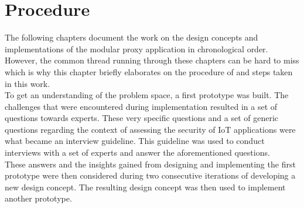 \chapter{Procedure}
The following chapters document the work on the design concepts and implementations of the modular proxy application in chronological order. However, the common thread running through these chapters can be hard to miss which is why this chapter briefly elaborates on the procedure of and steps taken in this work.\\
To get an understanding of the problem space, a first prototype was built. The challenges that were encountered during implementation resulted in a set of questions towards experts. These very specific questions and a set of generic questions regarding the context of assessing the security of \ac{IoT} applications were what became an interview guideline. This guideline was used to conduct interviews with a set of experts and answer the aforementioned questions.\\
These answers and the insights gained from designing and implementing the first prototype were then considered during two consecutive iterations of developing a new design concept. The resulting design concept was then used to implement another prototype.
